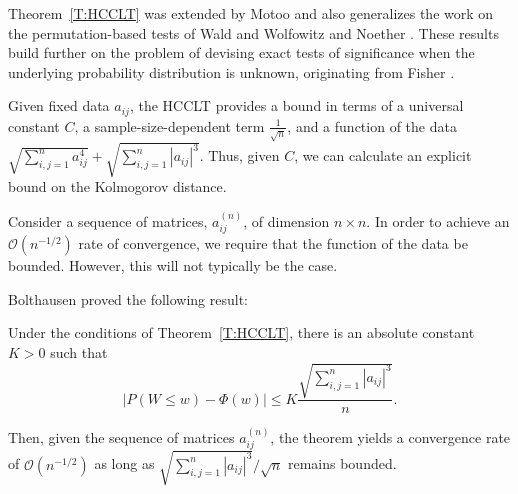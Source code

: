Theorem~\ref{T:HCCLT} was extended by Motoo \cite{motoo1956hoeffding} and
also generalizes the work on the permutation-based
tests of Wald and Wolfowitz \cite{wald1944statistical} and Noether
\cite{noether1949theorem}.  These results build further on the problem of
devising exact tests of significance when the underlying probability
distribution is unknown, originating from Fisher
\cite{fisher1935design, fisher1970statistical}.

Given fixed data $a_{ij}$, the HCCLT provides a bound in terms of a
universal constant $C$, a sample-size-dependent term
$\frac{1}{\sqrt{n}}$, and a function of the data $\sqrt{\sum_{i, j =
1}^{n} a_{ij}^4} + \sqrt{\sum_{i, j = 1}^{n} |a_{ij}|^3}$.  Thus,
given $C$, we can calculate an explicit bound on the Kolmogorov
distance.

Consider a sequence of matrices, $a_{ij}^{(n)}$, of dimension $n
\times n$.  In order to achieve an $\mathcal{O}(n^{-1/2})$ rate of
convergence, we require that the function of the data be bounded.
However, this will not typically be the case.

Bolthausen \cite{bolthausen1984estimate} proved the following result:
\begin{theorem}[Bolthausen]
  Under the conditions of Theorem~\ref{T:HCCLT}, there is an absolute constant
  $K > 0$ such that
  \begin{equation*}
    |P(W \leq w) - \Phi(w)| \leq K \frac{\sqrt{\sum_{i, j = 1}^{n} |a_{ij}|^3}}{n}.
  \end{equation*}
\end{theorem}

Then, given the sequence of matrices $a_{ij}^{(n)}$, the theorem
yields a convergence rate of $\mathcal{O}(n^{-1/2})$ as long as
$\sqrt{\sum_{i, j = 1}^{n} |a_{ij}|^3} / \sqrt{n}$ remains bounded.

